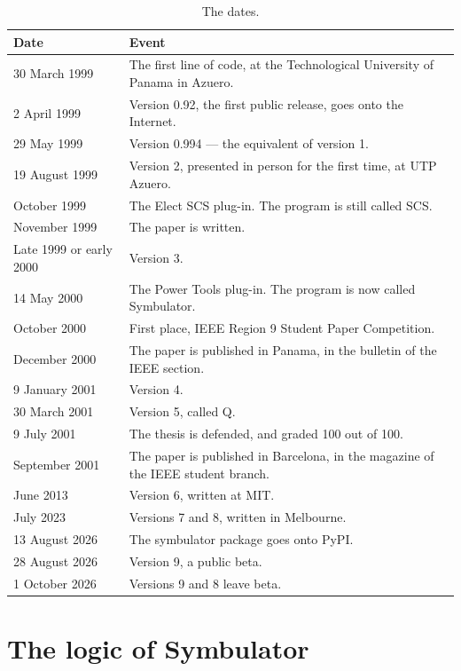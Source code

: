\documentclass[11pt,oneside]{report}
\begin{document}
\begin{table}[htbp]
\caption{The dates.}
\label{tab:timeline}
\centering
\begin{tabular}{@{}l>{\raggedright\arraybackslash}p{9.2cm}@{}}
\toprule
Date & Event \\
\midrule
30 March 1999 & The first line of code, at the Technological University of Panama in Azuero. \\
2 April 1999 & Version 0.92, the first public release, goes onto the Internet. \\
29 May 1999 & Version 0.994 — the equivalent of version 1. \\
19 August 1999 & Version 2, presented in person for the first time, at UTP Azuero. \\
October 1999 & The Elect SCS plug-in. The program is still called SCS. \\
November 1999 & The paper is written. \\
Late 1999 or early 2000 & Version 3. \\
14 May 2000 & The Power Tools plug-in. The program is now called Symbulator. \\
October 2000 & First place, IEEE Region 9 Student Paper Competition. \\
December 2000 & The paper is published in Panama, in the bulletin of the IEEE section. \\
9 January 2001 & Version 4. \\
30 March 2001 & Version 5, called Q. \\
9 July 2001 & The thesis is defended, and graded 100 out of 100. \\
September 2001 & The paper is published in Barcelona, in the magazine of the IEEE student branch. \\
June 2013 & Version 6, written at MIT. \\
July 2023 & Versions 7 and 8, written in Melbourne. \\
13 August 2026 & The symbulator package goes onto PyPI. \\
28 August 2026 & Version 9, a public beta. \\
1 October 2026 & Versions 9 and 8 leave beta. \\
\bottomrule
\end{tabular}
\end{table}


\chapter{The logic of Symbulator}
\label{ch:logic}
\end{document}

